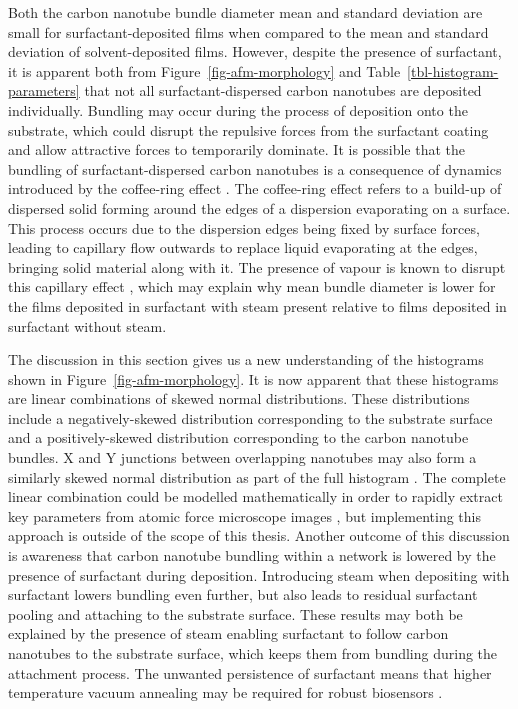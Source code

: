\documentclass[
  a4paper,
]{scrbook}
\begin{document}
Both the carbon nanotube bundle diameter mean and standard deviation are
small for surfactant-deposited films when compared to the mean and
standard deviation of solvent-deposited films. However, despite the
presence of surfactant, it is apparent both from
Figure~\ref{fig-afm-morphology} and Table~\ref{tbl-histogram-parameters}
that not all surfactant-dispersed carbon nanotubes are deposited
individually. Bundling may occur during the process of deposition onto
the substrate, which could disrupt the repulsive forces from the
surfactant coating and allow attractive forces to temporarily dominate.
It is possible that the bundling of surfactant-dispersed carbon
nanotubes is a consequence of dynamics introduced by the coffee-ring
effect \autocite{Deegan1997,VanGaalen2021}. The coffee-ring effect
refers to a build-up of dispersed solid forming around the edges of a
dispersion evaporating on a surface. This process occurs due to the
dispersion edges being fixed by surface forces, leading to capillary
flow outwards to replace liquid evaporating at the edges, bringing solid
material along with it. The presence of vapour is known to disrupt this
capillary effect \autocite{Bishop2020}, which may explain why mean
bundle diameter is lower for the films deposited in surfactant with
steam present relative to films deposited in surfactant without steam.

The discussion in this section gives us a new understanding of the
histograms shown in Figure~\ref{fig-afm-morphology}. It is now apparent
that these histograms are linear combinations of skewed normal
distributions. These distributions include a negatively-skewed
distribution corresponding to the substrate surface and a
positively-skewed distribution corresponding to the carbon nanotube
bundles. X and Y junctions between overlapping nanotubes may also form a
similarly skewed normal distribution as part of the full histogram
\autocite{Murugathas2018}. The complete linear combination could be
modelled mathematically in order to rapidly extract key parameters from
atomic force microscope images \autocite{Marchenko2010}, but
implementing this approach is outside of the scope of this thesis.
Another outcome of this discussion is awareness that carbon nanotube
bundling within a network is lowered by the presence of surfactant
during deposition. Introducing steam when depositing with surfactant
lowers bundling even further, but also leads to residual surfactant
pooling and attaching to the substrate surface. These results may both
be explained by the presence of steam enabling surfactant to follow
carbon nanotubes to the substrate surface, which keeps them from
bundling during the attachment process. The unwanted persistence of
surfactant means that higher temperature vacuum annealing may be
required for robust biosensors \autocite{Kane2014}.
\end{document}
